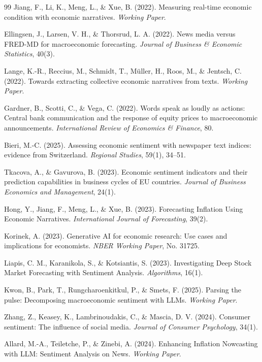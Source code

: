 \documentclass[11pt,twocolumn]{article}
\begin{document}
\begin{thebibliography}{99}
 Jiang, F., Li, K., Meng, L., \& Xue, B. (2022). Measuring real-time economic condition with economic narratives. \textit{Working Paper}.

 Ellingsen, J., Larsen, V. H., \& Thorsrud, L. A. (2022). News media versus FRED-MD for macroeconomic forecasting. \textit{Journal of Business \& Economic Statistics}, 40(3).

 Lange, K.-R., Reccius, M., Schmidt, T., Müller, H., Roos, M., \& Jentsch, C. (2022). Towards extracting collective economic narratives from texts. \textit{Working Paper}.

 Gardner, B., Scotti, C., \& Vega, C. (2022). Words speak as loudly as actions: Central bank communication and the response of equity prices to macroeconomic announcements. \textit{International Review of Economics \& Finance}, 80.

 Bieri, M.-C. (2025). Assessing economic sentiment with newspaper text indices: evidence from Switzerland. \textit{Regional Studies}, 59(1), 34--51.

 Tkacova, A., \& Gavurova, B. (2023). Economic sentiment indicators and their prediction capabilities in business cycles of EU countries. \textit{Journal of Business Economics and Management}, 24(1).

 Hong, Y., Jiang, F., Meng, L., \& Xue, B. (2023). Forecasting Inflation Using Economic Narratives. \textit{International Journal of Forecasting}, 39(2).

 Korinek, A. (2023). Generative AI for economic research: Use cases and implications for economists. \textit{NBER Working Paper}, No. 31725.

 Liapis, C. M., Karanikola, S., \& Kotsiantis, S. (2023). Investigating Deep Stock Market Forecasting with Sentiment Analysis. \textit{Algorithms}, 16(1).

 Kwon, B., Park, T., Rungcharoenkitkul, P., \& Smets, F. (2025). Parsing the pulse: Decomposing macroeconomic sentiment with LLMs. \textit{Working Paper}.

 Zhang, Z., Keasey, K., Lambrinoudakis, C., \& Mascia, D. V. (2024). Consumer sentiment: The influence of social media. \textit{Journal of Consumer Psychology}, 34(1).

 Allard, M.-A., Teiletche, P., \& Zinebi, A. (2024). Enhancing Inflation Nowcasting with LLM: Sentiment Analysis on News. \textit{Working Paper}.


\end{thebibliography}
\end{document}

